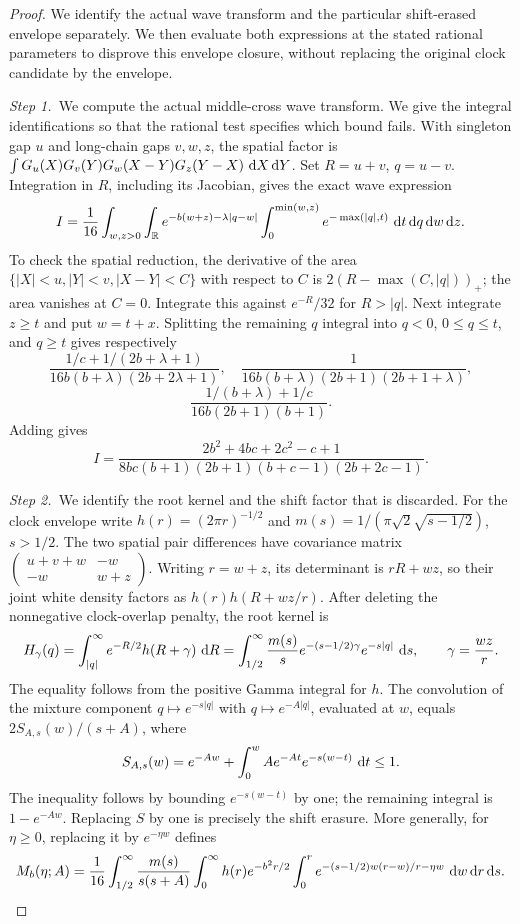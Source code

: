\begin{proof}
  We identify the actual wave transform and the particular shift-erased
  envelope separately. We then evaluate both expressions at the stated
  rational parameters to disprove this envelope closure, without replacing the
  original clock candidate by the envelope.


  \medskip
  \noindent\textit{Step 1.~}We compute the actual middle-cross wave transform.
  We give the integral identifications so that the rational test specifies
  which bound fails. With singleton gap $u$ and long-chain gaps $v,w,z$,
  the spatial factor is
  $\int G_u(X)G_v(Y)G_w(X-Y)G_z(Y-X)\,\,\mathrm{d} X\,\mathrm{d} Y$.
  Set $R=u+v$, $q=u-v$. Integration in $R$, including its Jacobian,
  gives the exact wave expression
  \[
    I=\frac1{16}\int_{w,z>0}\int_{\mathbb R}
    e^{-b(w+z)-\lambda|q-w|}
    \int_0^{\min(w,z)}e^{-\max(|q|,t)}\,\,\mathrm{d} t\,\mathrm{d} q\,\mathrm{d} w\,\mathrm{d} z.
  \]
  To check the spatial reduction, the derivative of the area
  $\{|X|<u,|Y|<v,|X-Y|<C\}$ with respect to $C$ is
  $2(R-\max(C,|q|))_+$; the area vanishes at $C=0$.
  Integrate this against $e^{-R}/32$ for $R>|q|$.
  Next integrate $z\ge t$ and put $w=t+x$. Splitting the remaining $q$
  integral into $q<0$, $0\le q\le t$, and $q\ge t$ gives respectively
  \[
    \frac{1/c+1/(2b+\lambda+1)}{16b(b+\lambda)(2b+2\lambda+1)},\quad
    \frac1{16b(b+\lambda)(2b+1)(2b+1+\lambda)},
  \]
  \[
    \frac{1/(b+\lambda)+1/c}{16b(2b+1)(b+1)}.
  \]
  Adding gives
  \[
    I=\frac{2b^2+4bc+2c^2-c+1}
    {8bc(b+1)(2b+1)(b+c-1)(2b+2c-1)}.
  \]


  \medskip
  \noindent\textit{Step 2.~}We identify the root kernel and the shift factor
  that is discarded.
  For the clock envelope write $h(r)=(2\pi r)^{-1/2}$ and
  $m(s)=1/(\pi\sqrt2\sqrt{s-1/2})$, $s>1/2$.
  The two spatial pair differences have covariance matrix
  $\left(\begin{smallmatrix}u+v+w&-w\\-w&w+z\end{smallmatrix}\right)$.
  Writing $r=w+z$, its determinant is $rR+wz$, so their joint white
  density factors as $h(r)h(R+wz/r)$. After deleting the nonnegative
  clock-overlap penalty, the root kernel is
  \[
    H_\gamma(q)=\int_{|q|}^\infty e^{-R/2}h(R+\gamma)\,\,\mathrm{d} R
    =\int_{1/2}^\infty\frac{m(s)}s
    e^{-(s-1/2)\gamma}e^{-s|q|}\,\,\mathrm{d} s,
    \qquad \gamma=\frac{wz}{r}.
  \]
  The equality follows from the positive Gamma integral for $h$.
  The convolution of the mixture component $q\mapsto e^{-s|q|}$ with
  $q\mapsto e^{-A|q|}$, evaluated at $w$, equals $2S_{A,s}(w)/(s+A)$, where
  \[
    S_{A,s}(w)=e^{-Aw}+\int_0^w A e^{-At}e^{-s(w-t)}\,\,\mathrm{d} t\le1.
  \]
  The inequality follows by bounding $e^{-s(w-t)}$ by one; the remaining
  integral is $1-e^{-Aw}$.
  Replacing $S$ by one is precisely the shift erasure. More generally, for
  $\eta\ge0$, replacing it by $e^{-\eta w}$ defines
  \[
    M_b(\eta;A)=\frac1{16}\int_{1/2}^\infty
    \frac{m(s)}{s(s+A)}\int_0^\infty h(r)e^{-b^2r/2}
    \int_0^r e^{-(s-1/2)w(r-w)/r-\eta w}\,\,\mathrm{d} w\,\mathrm{d} r\,\mathrm{d} s.
  \]


\end{proof}
